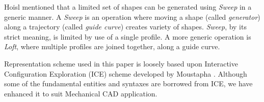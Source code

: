Hoisl \cite{Hoisl2012} mentioned that a limited set of shapes can be generated using {\em Sweep} in a generic manner. A {\em Sweep} is an operation where moving a shape (called {\em generator}) along a trajectory (called {\em guide curve}) creates variety of shapes. {\em Sweep}, by its strict meaning, is limited by use of a single profile. A more generic operation is {\em Loft}, where multiple profiles are joined together, along a guide curve. 
%
%
%
%

Representation scheme used in this paper is loosely based upon Interactive Configuration Exploration  (ICE) scheme developed by Moustapha \cite{Hoda2005}. Although some of the fundamental entities and syntaxes are borrowed from ICE, we have enhanced it to suit Mechanical CAD application.


